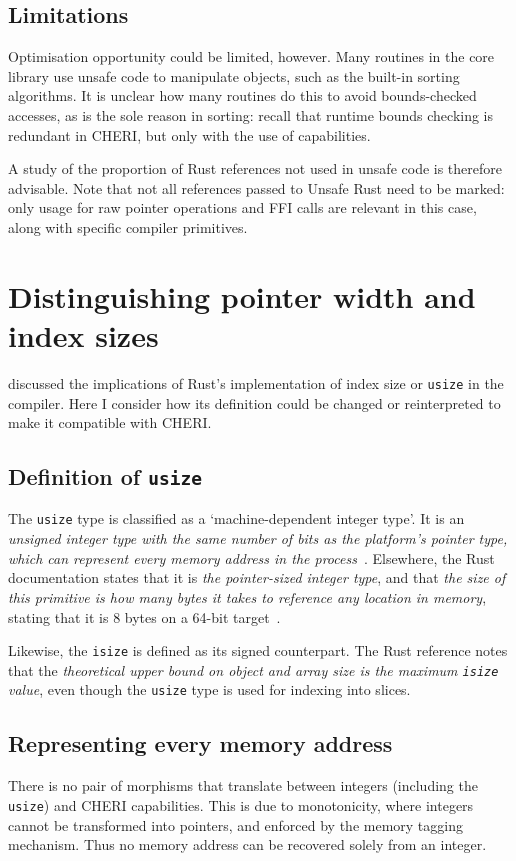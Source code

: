 \documentclass[dissertation.tex]{subfiles}
\begin{document}
\subsection{Limitations}
Optimisation opportunity could be limited, however.
Many routines in the core library use unsafe code to manipulate objects,
such as the built-in sorting algorithms.
It is unclear how many routines do this to avoid bounds-checked
accesses, as is the sole reason in sorting: recall that runtime bounds
checking is redundant in CHERI, but only with the use of capabilities.

A study of the proportion of Rust references not used in unsafe code is
therefore advisable.
Note that not all references passed to Unsafe Rust need to be marked:
only usage for raw pointer operations and FFI calls are relevant in this
case, along with specific compiler primitives.


\section{Distinguishing pointer width and index sizes}
\label{sec:eval-usize}

 discussed the implications of
Rust's implementation of index size or \texttt{usize} in the compiler.
Here I consider how its definition could be changed or reinterpreted to
make it compatible with CHERI.

\subsection{Definition of \texttt{usize}}
The \texttt{usize} type is classified as a `machine-dependent integer
type'.
It is an \emph{unsigned integer type with the same number of bits as the
platform's pointer type, which can represent every memory address in the
process}~\cite{rust-ref}.
Elsewhere, the Rust documentation states that it is \emph{the
pointer-sized integer type}, and that \emph{the size of this primitive
is how many bytes it takes to reference any location in memory}, stating
that it is 8 bytes on a 64-bit target~\cite{rust-std-primitive-usize}.

Likewise, the \texttt{isize} is defined as its signed counterpart.
The Rust reference notes that the \emph{theoretical upper bound on
object and array size is the maximum \texttt{isize} value}, even though
the \texttt{usize} type is used for indexing into slices.

\subsection{Representing every memory address}
There is no pair of morphisms that translate between integers (including
the \texttt{usize}) and CHERI capabilities.
This is due to monotonicity, where integers cannot be transformed into
pointers, and enforced by the memory tagging mechanism.
Thus no memory address can be recovered solely from an integer.
\end{document}
